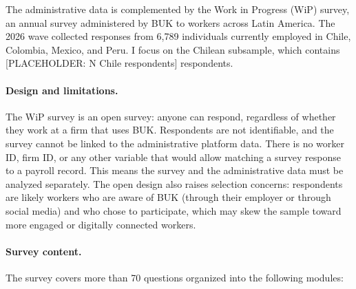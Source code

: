 \documentclass[11pt]{article}
\begin{document}
The administrative data is complemented by the Work in Progress (WiP) survey, an annual survey administered by BUK to workers across Latin America. The 2026 wave collected responses from 6,789 individuals currently employed in Chile, Colombia, Mexico, and Peru. I focus on the Chilean subsample, which contains [PLACEHOLDER: N Chile respondents] respondents.

\paragraph{Design and limitations.} The WiP survey is an open survey: anyone can respond, regardless of whether they work at a firm that uses BUK. Respondents are not identifiable, and the survey cannot be linked to the administrative platform data. There is no worker ID, firm ID, or any other variable that would allow matching a survey response to a payroll record. This means the survey and the administrative data must be analyzed separately. The open design also raises selection concerns: respondents are likely workers who are aware of BUK (through their employer or through social media) and who chose to participate, which may skew the sample toward more engaged or digitally connected workers.

\paragraph{Survey content.} The survey covers more than 70 questions organized into the following modules:
\end{document}
